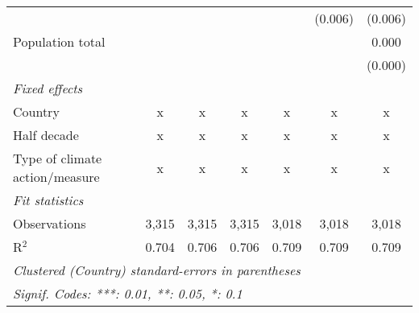 \begin{tabular}{lcccccc}
                                              &               &               &               &               & (0.006)       & (0.006)\\   
   Population total                           &               &               &               &               &               & 0.000\\   
                                              &               &               &               &               &               & (0.000)\\   
   \emph{Fixed effects}\\
   Country                                    & x             & x             & x             & x             & x             & x\\  
   Half decade                                & x             & x             & x             & x             & x             & x\\  
   Type of climate action/measure             & x             & x             & x             & x             & x             & x\\  
   \midrule \emph{Fit statistics}\\
   Observations                               & 3,315         & 3,315         & 3,315         & 3,018         & 3,018         & 3,018\\  
   R$^2$                                      & 0.704         & 0.706         & 0.706         & 0.709         & 0.709         & 0.709\\  
   \midrule
   \multicolumn{7}{l}{\emph{Clustered (Country) standard-errors in parentheses}}\\
   \multicolumn{7}{l}{\emph{Signif. Codes: ***: 0.01, **: 0.05, *: 0.1}}\\
\end{tabular}
\par\endgroup


